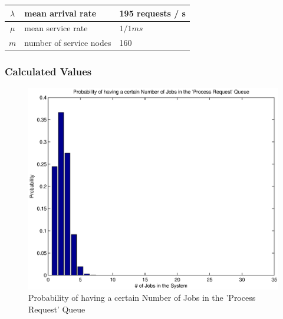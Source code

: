 \documentclass[a4paper]{article}
\begin{document}
\begin{tabular}{|c|l|l|}
\hline 
$\lambda$ & mean arrival rate & 195 requests / s \\ 
\hline 
$\mu$ & mean service rate & $1/1ms$ \\ 
\hline 
$m$ & number of service nodes & 160 \\ 
\hline 
\end{tabular} 

\subsubsection{Calculated Values}


\begin{figure}[H]
	\begin{center}
    \includegraphics[scale=0.6]{../plots-ms2-mg/queueanalysis-2ProcessRequest.eps}
  \end{center}
  \caption{Probability of having a certain Number of Jobs in the 'Process Request' Queue}
  \label{fig:queueanalysis2}
\end{figure}

\end{document}
